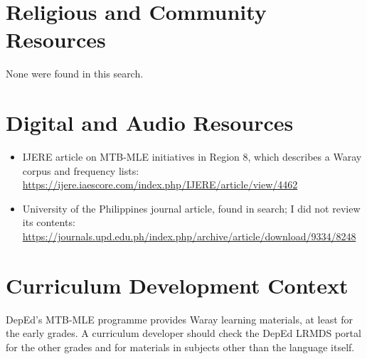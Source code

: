 \documentclass[12pt]{article}
\begin{document}
\section{Religious and Community Resources}
None were found in this search.

\section{Digital and Audio Resources}
\begin{itemize}
\item IJERE article on MTB-MLE initiatives in Region 8, which describes a Waray corpus and frequency lists: \url{https://ijere.iaescore.com/index.php/IJERE/article/view/4462}
\item University of the Philippines journal article, found in search; I did not review its contents: \url{https://journals.upd.edu.ph/index.php/archive/article/download/9334/8248}
\end{itemize}

\section{Curriculum Development Context}
DepEd's MTB-MLE programme provides Waray learning materials, at least for the early grades. A curriculum developer should check the DepEd LRMDS portal for the other grades and for materials in subjects other than the language itself.
\end{document}
